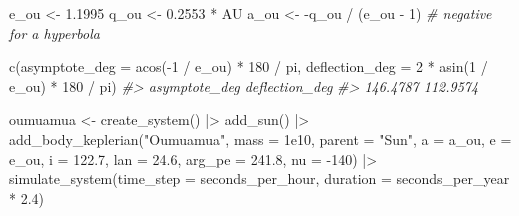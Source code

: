 \documentclass[
  10.5pt,
  letterpaper,
]{scrbook}
\newenvironment{Shaded}{\begin{snugshade}}{\end{snugshade}}
\newcommand{\AttributeTok}[1]{\textcolor[rgb]{0.00,0.00,0.00}{#1}}
\newcommand{\CommentTok}[1]{\textcolor[rgb]{0.00,0.00,0.00}{\textit{#1}}}
\newcommand{\DecValTok}[1]{\textcolor[rgb]{0.00,0.00,0.00}{#1}}
\newcommand{\FloatTok}[1]{\textcolor[rgb]{0.00,0.00,0.00}{#1}}
\newcommand{\FunctionTok}[1]{\textcolor[rgb]{0.00,0.00,0.00}{#1}}
\newcommand{\NormalTok}[1]{\textcolor[rgb]{0.00,0.00,0.00}{#1}}
\newcommand{\OtherTok}[1]{\textcolor[rgb]{0.00,0.00,0.00}{#1}}
\newcommand{\SpecialCharTok}[1]{\textcolor[rgb]{0.00,0.00,0.00}{#1}}
\newcommand{\StringTok}[1]{\textcolor[rgb]{0.00,0.00,0.00}{#1}}
\theoremstyle{definition}
\theoremstyle{plain}
\theoremstyle{remark}
\begin{document}
\begin{Shaded}
\begin{Highlighting}[]
\NormalTok{e\_ou }\OtherTok{\textless{}{-}} \FloatTok{1.1995}
\NormalTok{q\_ou }\OtherTok{\textless{}{-}} \FloatTok{0.2553} \SpecialCharTok{*}\NormalTok{ AU}
\NormalTok{a\_ou }\OtherTok{\textless{}{-}} \SpecialCharTok{{-}}\NormalTok{q\_ou }\SpecialCharTok{/}\NormalTok{ (e\_ou }\SpecialCharTok{{-}} \DecValTok{1}\NormalTok{)                   }\CommentTok{\# negative for a hyperbola}

\FunctionTok{c}\NormalTok{(}\AttributeTok{asymptote\_deg =} \FunctionTok{acos}\NormalTok{(}\SpecialCharTok{{-}}\DecValTok{1} \SpecialCharTok{/}\NormalTok{ e\_ou) }\SpecialCharTok{*} \DecValTok{180} \SpecialCharTok{/}\NormalTok{ pi,}
  \AttributeTok{deflection\_deg =} \DecValTok{2} \SpecialCharTok{*} \FunctionTok{asin}\NormalTok{(}\DecValTok{1} \SpecialCharTok{/}\NormalTok{ e\_ou) }\SpecialCharTok{*} \DecValTok{180} \SpecialCharTok{/}\NormalTok{ pi)}
\CommentTok{\#\textgreater{}  asymptote\_deg deflection\_deg }
\CommentTok{\#\textgreater{}       146.4787       112.9574}

\NormalTok{oumuamua }\OtherTok{\textless{}{-}} \FunctionTok{create\_system}\NormalTok{() }\SpecialCharTok{|\textgreater{}}
  \FunctionTok{add\_sun}\NormalTok{() }\SpecialCharTok{|\textgreater{}}
  \FunctionTok{add\_body\_keplerian}\NormalTok{(}\StringTok{"Oumuamua"}\NormalTok{, }\AttributeTok{mass =} \FloatTok{1e10}\NormalTok{, }\AttributeTok{parent =} \StringTok{"Sun"}\NormalTok{,}
                     \AttributeTok{a =}\NormalTok{ a\_ou, }\AttributeTok{e =}\NormalTok{ e\_ou, }\AttributeTok{i =} \FloatTok{122.7}\NormalTok{, }\AttributeTok{lan =} \FloatTok{24.6}\NormalTok{,}
                     \AttributeTok{arg\_pe =} \FloatTok{241.8}\NormalTok{, }\AttributeTok{nu =} \SpecialCharTok{{-}}\DecValTok{140}\NormalTok{) }\SpecialCharTok{|\textgreater{}}
  \FunctionTok{simulate\_system}\NormalTok{(}\AttributeTok{time\_step =}\NormalTok{ seconds\_per\_hour, }\AttributeTok{duration =}\NormalTok{ seconds\_per\_year }\SpecialCharTok{*} \FloatTok{2.4}\NormalTok{)}
\end{Highlighting}
\end{Shaded}
\end{document}
